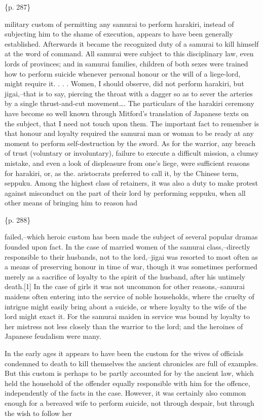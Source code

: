 \{p. 287\}

military custom of permitting any samurai to perform harakiri, instead of subjecting him to the shame of execution, appears to have been generally established. Afterwards it became the recognized duty of a samurai to kill himself at the word of command. All samurai were subject to this disciplinary law, even lords of provinces; and in samurai families, children of both sexes were trained how to perform suicide whenever personal honour or the will of a liege-lord, might require it. . . . Women, I should observe, did not perform harakiri, but jigai,--that is to say, piercing the throat with a dagger so as to sever the arteries by a single thrust-and-cut movement\ldots{}. The particulars of the harakiri ceremony have become so well known through Mitford's translation of Japanese texts on the subject, that I need not touch upon them. The important fact to remember is that honour and loyalty required the samurai man or woman to be ready at any moment to perform self-destruction by the sword. As for the warrior, any breach of trust (voluntary or involuntary), failure to execute a difficult mission, a clumsy mistake, and even a look of displeasure from one's liege, were sufficient reasons for harakiri, or, as the. aristocrats preferred to call it, by the Chinese term, seppuku. Among the highest class of retainers, it was also a duty to make protest against misconduct on the part of their lord by performing seppuku, when all other means of bringing him to reason had

\{p. 288\}

failed,--which heroic custom has been made the subject of several popular dramas founded upon fact. In the case of married women of the samurai class,--directly responsible to their husbands, not to the lord,--jigai was resorted to most often as a means of preserving honour in time of war, though it was sometimes performed merely as a sacrifice of loyalty to the spirit of the husband, after his untimely death.[1] In the case of girls it was not uncommon for other reasons,--samurai maidens often entering into the service of noble households, where the cruelty of intrigue might easily bring about a suicide, or where loyalty to the wife of the lord might exact it. For the samurai maiden in service was bound by loyalty to her mistress not less closely than the warrior to the lord; and the heroines of Japanese feudalism were many.

In the early ages it appears to have been the custom for the wives of officials condemned to death to kill themselves the ancient chronicles are full of examples. But this custom is perhaps to be partly accounted for by the ancient law, which held the household of the offender equally responsible with him for the offence, independently of the facts in the case. However, it was certainly also common enough for a bereaved wife to perform suicide, not through despair, but through the wish to follow her

